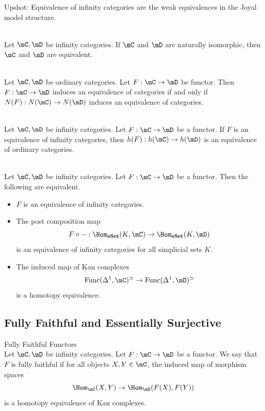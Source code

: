 \documentclass[a4paper]{article}
\begin{document}
Upshot: Equivalence of infinity categories are the weak equivalences in the Joyal model structure. 

\begin{lmm}{}{}\\ Let $\mC,\mD$ be infinity categories. If $\mC$ and $\mD$ are naturally isomorphic, then $\mC$ and $\mD$ are equivalent. 
\end{lmm}

\begin{prp}{}{}\\ Let $\mC,\mD$ be ordinary categories. Let $F:\mC\to\mD$ be functor. Then $F:\mC\to\mD$ induces an equivalence of categories if and only if $N(F):N(\mC)\to N(\mD)$ induces an equivalence of categories. 
\end{prp}

\begin{prp}{}{}\\ Let $\mC,\mD$ be infinity categories. Let $F:\mC\to\mD$ be a functor. If $F$ is an equivalence of infinity categories, then $h(F):h(\mC)\to h(\mD)$ is an equivalence of ordinary categories. 
\end{prp}

\begin{prp}{}{}\\
Let $\mC,\mD$ be infinity categories. Let $F:\mC\to\mD$ be a functor. Then the following are equivalent. 
\begin{itemize}
\item $F$ is an equivalence of infinity categories. 
\item The post composition map $$F\circ -:\Hom_\bold{sSet}(K,\mC)\to\Hom_\bold{sSet}(K,\mD)$$ is an equivalence of infinity categories for all simplicial sets $K$. 
\item The induced map of Kan complexes $$\text{Func}(\Delta^1,\mC)^\simeq\to\text{Func}(\Delta^1,\mD)^\simeq$$ is a homotopy equivalence. 
\end{itemize}
\end{prp}

\subsection{Fully Faithful and Essentially Surjective}
\begin{defn}{Fully Faithful Functors}{}\\ Let $\mC,\mD$ be infinity categories. Let $F:\mC\to\mD$ be a functor. We say that $F$ is fully faithful if for all objects $X,Y\in\mC$, the induced map of morphism spaces $$\Hom_\mC(X,Y)\to\Hom_\mD(F(X),F(Y))$$ is a homotopy equivalence of Kan complexes. 
\end{defn}
\end{document}
